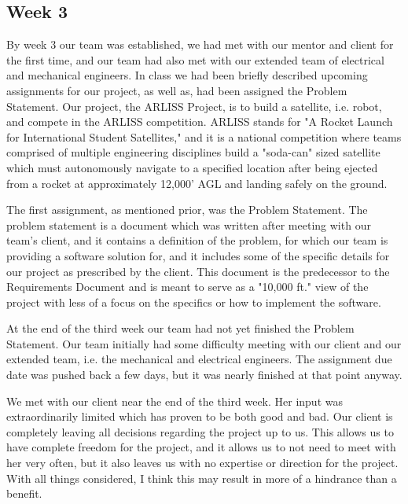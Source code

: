 \documentclass[10pt,letterpaper,onecolumn,draftclsnofoot,journal]{IEEEtran}
\begin{document}
\subsection{Week 3}
By week 3 our team was established, we had met with our mentor and client for the first time, and our team had also met with our extended team of electrical and mechanical engineers. In class we had been briefly described upcoming assignments for our project, as well as, had been assigned the Problem Statement. Our project, the ARLISS Project, is to build a satellite, i.e. robot, and compete in the ARLISS competition. ARLISS stands for "A Rocket Launch for International Student Satellites," and it is a national competition where teams comprised of multiple engineering disciplines build a "soda-can" sized satellite which must autonomously navigate to a specified location after being ejected from a rocket at approximately 12,000' AGL and landing safely on the ground.\vspace{.3cm}
\par
The first assignment, as mentioned prior, was the Problem Statement. The problem statement is a document which was written after meeting with our team's client, and it contains a definition of the problem, for which our team is providing a software solution for, and it includes some of the specific details for our project as prescribed by the client. This document is the predecessor to the Requirements Document and is meant to serve as a "10,000 ft." view of the project with less of a focus on the specifics or how to implement the software.\vspace{.3cm}
\par 
At the end of the third week our team had not yet finished the Problem Statement. Our team initially had some difficulty meeting with our client and our extended team, i.e. the mechanical and electrical engineers. The assignment due date was pushed back a few days, but it was nearly finished at that point anyway.\vspace{.3cm}
\par 
We met with our client near the end of the third week. Her input was extraordinarily limited which has proven to be both good and bad. Our client is completely leaving all decisions regarding the project up to us. This allows us to have complete freedom for the project, and it allows us to not need to meet with her very often, but it also leaves us with no expertise or direction for the project. With all things considered, I think this may result in more of a hindrance than a benefit.
\end{document}
